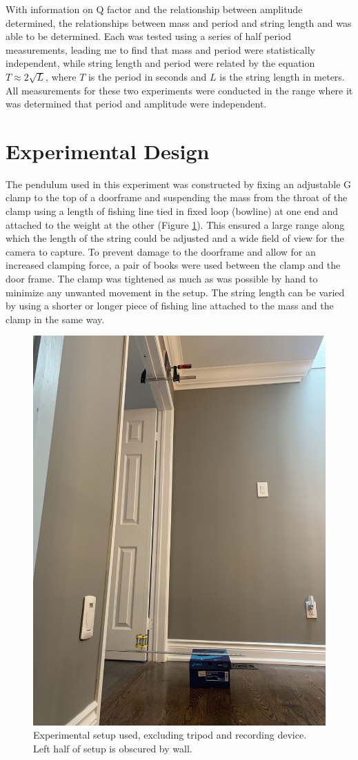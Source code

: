 \documentclass[11pt]{article}
\begin{document}
        With information on Q factor and the relationship between amplitude determined, the relationships between mass and period and string length and was able to be determined. Each was tested using a series of half period measurements, leading me to find that mass and period were statistically independent, while string length and period were related by the equation $T \approx 2\sqrt{L}$, where $T$ is the period in seconds and $L$ is the string length in meters. All measurements for these two experiments were conducted in the range where it was determined that period and amplitude were independent.

    \section{Experimental Design}\label{sec:design}
        The pendulum used in this experiment was constructed by fixing an adjustable G clamp to the top of a doorframe and suspending the mass from the throat of the clamp using a length of fishing line tied in fixed loop (bowline) at one end and attached to the weight at the other (Figure \ref{fig:setup}). This ensured a large range along which the length of the string could be adjusted and a wide field of view for the camera to capture. To prevent damage to the doorframe and allow for an increased clamping force, a pair of books were used between the clamp and the door frame. The clamp was tightened as much as was possible by hand to minimize any unwanted movement in the setup. The string length can be varied by using a shorter or longer piece of fishing line attached to the mass and the clamp in the same way. 

        \begin{figure}[H]
            \centering\includegraphics[width=.7\linewidth]{setup.jpg}
            \caption{Experimental setup used, excluding tripod and recording device. Left half of setup is obscured by wall.}
            \label{fig:setup}
        \end{figure}
        
\end{document}
